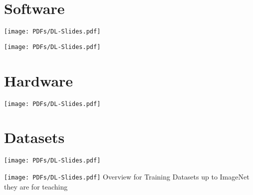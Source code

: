 \section{Software}
\texttt{[image: PDFs/DL-Slides.pdf]}

\texttt{[image: PDFs/DL-Slides.pdf]}
\section{Hardware}
\texttt{[image: PDFs/DL-Slides.pdf]}

\section{Datasets}
\texttt{[image: PDFs/DL-Slides.pdf]}

\texttt{[image: PDFs/DL-Slides.pdf]}
\textbullet Overview for Training Datasets up to ImageNet they are for teaching